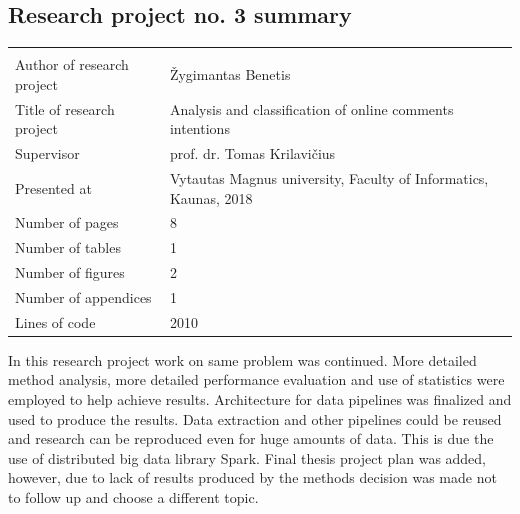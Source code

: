 \documentclass[a4paper,12pt]{article}
\begin{document}
    
    	\subsection{Research project no. 3 summary}
    
    
    \noindent
    \begin{center}
		\begin{tabular}{L{4.5cm} L{8cm}}
    		\\ 
    		Author of research project & Žygimantas Benetis \\
    		Title of research project & Analysis and classification of online comments intentions\\
    		Supervisor & prof. dr. Tomas Krilavičius\\
    		Presented at & Vytautas Magnus university, Faculty of Informatics, Kaunas, 2018\\
    		Number of pages & 8\\
    		Number of tables & 1\\
    		Number of figures & 2\\
    		Number of appendices & 1\\
    		Lines of code & 2010\\
    	\end{tabular}
    \end{center} 
    
    In this research project work on same problem was continued. More detailed method analysis, more detailed performance evaluation and use of statistics were employed to help achieve results. Architecture for data pipelines was finalized and used to produce the results. Data extraction and other pipelines could be reused and research can be reproduced even for huge amounts of data. This is due the use of distributed big data library Spark. Final thesis project plan was added, however, due to lack of results produced by the methods decision was made not to follow up and choose a different topic.
    
    \clearpage
    
    
\end{document}
